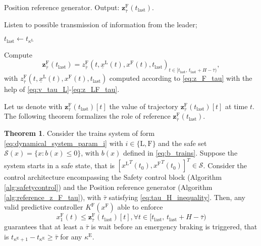 \documentclass[letterpaper, 10 pt, conference]{ieeeconf}
\theoremstyle{definition}
\theoremstyle{nopoint}
\newtheorem{theorem}{Theorem}[section]
\newcounter{Theorem}
\begin{document}
\begin{algorithm}
\caption{Position reference generator. Output: $\mathbf{z}_{\bar{\tau}}^\mathrm{F}(t_{\mathrm{last}})$. }\label{alg:reference_z_F_tau}
\begin{algorithmic}[1]
\Loop

\State Listen to possible transmission of information from the leader;

 
\State $t_{\mathrm{last}} \leftarrow t_{\kappa^\mathrm{L}}$

\State Compute
\begin{equation}\label{eq:reference_z_F_tau}
 \mathbf{z}_{\bar{\tau}}^\mathrm{F}(t_{\mathrm{last}})={z_{\bar{\tau}}^\mathrm{F}(t,\underline{x}^\mathrm{L}(t),x^\mathrm{F}(t),t_{\mathrm{last}})}_{t\in [t_{\mathrm{last}}, \, t_{\mathrm{last}}+H-\bar{\tau} )},
\end{equation}
with $z_{\bar{\tau}}^\mathrm{F}(t,\underline{x}^\mathrm{L}(t),x^\mathrm{F}(t),t_{\mathrm{last}})$ computed according to \eqref{eq:z_F_tau} with the help of \eqref{eq:v_tau_L}\--\eqref{eq:z_LF_tau}.


\EndIf


\EndLoop

\end{algorithmic}
\end{algorithm}

 
Let us denote with  $\mathbf{z}_{\bar{\tau}}^\mathrm{F}(t_{\mathrm{last}})[t]$ the value of trajectory $\mathbf{z}_{\bar{\tau}}^\mathrm{F}(t_{\mathrm{last}})[t]$ at time $t$.
The following theorem formalizes the role of reference $\mathbf{z}_{\bar{\tau}}^\mathrm{F}(t_{\mathrm{last}})$. 

\begin{theorem}\label{thm:tau_far_control}
Consider the trains system of form \eqref{eq:dynamical_system_param_i} with $i\in\{\mathrm{L},\mathrm{F}\}$ and the safe set $\mathcal{S}(x)=\{x: b(x)\leq 0\}$, with $b(x)$ defined in \eqref{eq:b_trains}. 
Suppose the system starts in a safe state, that is $[{x^\mathrm{L}}^T(t_0),{x^\mathrm{F}}^T(t_0)]^T\in\mathcal{S}$. Consider the control architecture encompassing  the Safety control block (Algorithm \ref{alg:safetycontrol}) and the Position reference generator (Algorithm \ref{alg:reference_z_F_tau}), with $\bar{\tau}$ satisfying \eqref{eq:tau_H_inequality}. Then, any valid predictive controller $K^\mathrm{F}(x^\mathrm{F})$ able to enforce
\begin{equation}\label{eq:tau_far_constraint}
x_1^\mathrm{F}(t)\leq  \mathbf{z}_{\bar{\tau}}^\mathrm{F}(t_{\mathrm{last}})[t], \forall t \in [t_{\mathrm{last}}, \, t_{\mathrm{last}}+H-\bar{\tau})
\end{equation} 
guarantees that at least a $\bar{\tau}$ is wait before an emergency braking is triggered, that is
$ t_{\kappa^\mathrm{E} +1} -t_{\kappa^\mathrm{E}}\geq \bar{\tau}$ for any  $\kappa^\mathrm{E}$.

\end{theorem}
 
\end{document}
